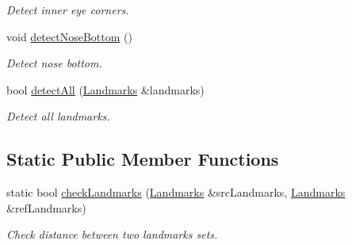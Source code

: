 \begin{DoxyCompactItemize}
\begin{DoxyCompactList}\small\item\em Detect inner eye corners. \end{DoxyCompactList}\item 
\hypertarget{class_landmark_detector_aa3c53cac45cfc7605b0f7ad85a5e8ca7}{void \hyperlink{class_landmark_detector_aa3c53cac45cfc7605b0f7ad85a5e8ca7}{detect\+Nose\+Bottom} ()}\label{class_landmark_detector_aa3c53cac45cfc7605b0f7ad85a5e8ca7}

\begin{DoxyCompactList}\small\item\em Detect nose bottom. \end{DoxyCompactList}\item 
bool \hyperlink{class_landmark_detector_a05ccf70a8911910dcdea9b07dc5dc0bc}{detect\+All} (\hyperlink{class_landmarks}{Landmarks} \&landmarks)
\begin{DoxyCompactList}\small\item\em Detect all landmarks. \end{DoxyCompactList}\end{DoxyCompactItemize}
\subsection*{Static Public Member Functions}
\begin{DoxyCompactItemize}
\item 
static bool \hyperlink{class_landmark_detector_aa2c1f6f7e3761542be61143bc71c2927}{check\+Landmarks} (\hyperlink{class_landmarks}{Landmarks} \&src\+Landmarks, \hyperlink{class_landmarks}{Landmarks} \&ref\+Landmarks)
\begin{DoxyCompactList}\small\item\em Check distance between two landmarks sets. \end{DoxyCompactList}\end{DoxyCompactItemize}
